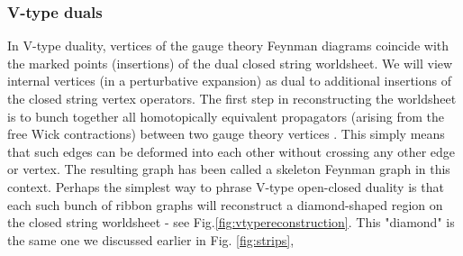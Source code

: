 \documentclass[english]{article}
\let\mc=\mathcal
\begin{document}


\subsubsection*{V-type duals}


In V-type duality, vertices of the gauge theory Feynman diagrams coincide with the marked points (insertions) of the dual closed string worldsheet. We will view internal vertices (in a perturbative expansion) as dual to additional insertions of the closed string vertex operators. The first step in reconstructing the worldsheet is to bunch together all homotopically equivalent propagators (arising from the free Wick contractions) between two gauge theory vertices \cite{freefieldsadsII}. This simply means that such edges can be deformed into each other without crossing any other edge or vertex. The resulting graph has been called a skeleton Feynman graph in this context. Perhaps the simplest way to phrase V-type open-closed duality is that each such bunch of ribbon graphs will reconstruct a diamond-shaped region on the closed string worldsheet - see Fig.\ref{fig:vtypereconstruction}. This "diamond" is the same one we discussed earlier in Fig. \ref{fig:strips}, 
\end{document}
